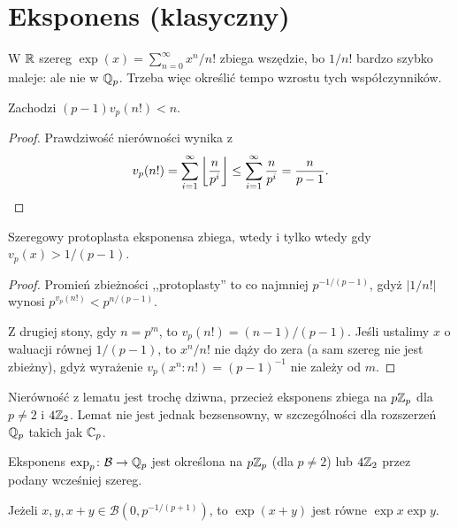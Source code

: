 \section{Eksponens (klasyczny)}
W  $\mathbb R$ szereg $\exp(x) = \sum_{n = 0}^\infty x^n/n!$ zbiega wszędzie, bo $1/n!$ bardzo szybko maleje: ale nie w $\mathbb Q_p$.
Trzeba więc określić tempo wzrostu tych współczynników.

\begin{lemat}
	Zachodzi $(p-1) v_p(n!) < n$.
\end{lemat}

\begin{proof}
	Prawdziwość nierówności wynika z
	\[
		v_p(n!) = \sum_{i = 1}^\infty \left \lfloor \frac n {p^i} \right \rfloor \le \sum_{i = 1}^\infty \frac n {p^i} = \frac n {p-1}. \qedhere
	\]
\end{proof}

\begin{lemat}
	Szeregowy protoplasta eksponensa zbiega, wtedy i tylko wtedy gdy $v_p(x) > 1 / (p-1)$. 
\end{lemat}

\begin{proof}
	Promień zbieżności ,,protoplasty'' to co najmniej $p^{-1/(p-1)}$, gdyż $|1/n!|$ wynosi $p^{v_p(n!)} < p^{n/(p-1)}$.
	
	Z drugiej stony, gdy $n = p^m$, to $v_p(n!) = (n-1)/(p-1)$.
	Jeśli ustalimy $x$ o waluacji równej $1 / (p-1)$, to $x^n/n!$ nie dąży do zera (a sam szereg nie jest zbieżny), gdyż wyrażenie $v_p(x^n : n!) = (p-1)^{-1}$ nie zależy od $m$.
\end{proof}

Nierówność z lematu jest trochę dziwna, przecież eksponens zbiega na $p \mathbb Z_p$ dla $p \neq 2$ i $4\mathbb Z_2$.
Lemat nie jest jednak bezsensowny, w szczególności dla rozszerzeń $\mathbb Q_p$ takich jak $\mathbb C_p$.

\begin{definicja}
	Eksponens $\exp_p \colon \mathcal B \to \mathbb Q_p$ jest określona na $p\mathbb Z_p$ (dla $p \neq 2$) lub $4\mathbb Z_2$ przez podany wcześniej szereg.
\end{definicja}

\begin{fakt}
	Jeżeli $x, y, x+y \in \mathcal B(0, p^{-1/(p+1)})$, to $\exp(x+y)$ jest równe $\exp x \exp y$.
\end{fakt}

